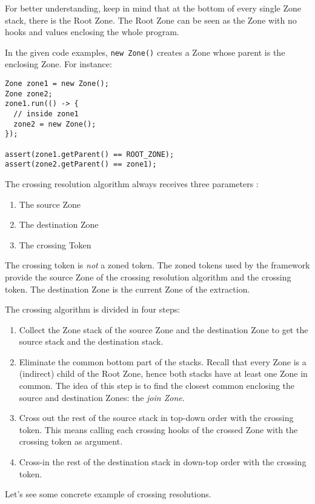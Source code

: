 For better understanding, keep in mind that at the bottom of every single Zone stack, there is the Root Zone. The Root Zone can be seen as the Zone with no hooks and values enclosing the whole program.

In the given code examples, \lstinline{new Zone()} creates a Zone whose parent is the enclosing Zone. For instance:

\begin{lstlisting}
Zone zone1 = new Zone();
Zone zone2;
zone1.run(() -> {
  // inside zone1
  zone2 = new Zone();
});

assert(zone1.getParent() == ROOT_ZONE);
assert(zone2.getParent() == zone1);
\end{lstlisting}

The crossing resolution algorithm always receives three parameters :

\begin{enumerate}
\item The source Zone
\item The destination Zone
\item The crossing Token
\end{enumerate}

The crossing token is \emph{not} a zoned token. The zoned tokens used by the framework provide the source Zone of the crossing resolution algorithm and the crossing token. The destination Zone is the current Zone of the extraction.

The crossing algorithm is divided in four steps:
\begin{enumerate}
\item Collect the Zone stack of the source Zone and the destination Zone to get the source stack and the destination stack.
\item Eliminate the common bottom part of the stacks. Recall that every Zone is a (indirect) child of the Root Zone, hence both stacks have at least one Zone in common. The idea of this step is to find the closest common enclosing the source and destination Zones: the \emph{join Zone}.
\item Cross out the rest of the source stack in top-down order with the crossing token. This means calling each crossing hooks of the crossed Zone with the crossing token as argument.
\item Cross-in the rest of the destination stack in down-top order with the crossing token.
\end{enumerate}

Let's see some concrete example of crossing resolutions.

